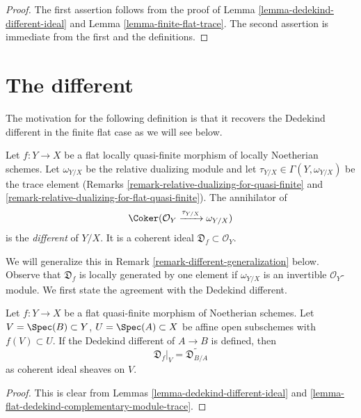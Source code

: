 \begin{proof}
The first assertion
follows from the proof of Lemma \ref{lemma-dedekind-different-ideal}
and Lemma \ref{lemma-finite-flat-trace}.
The second assertion is immediate from the first and the
definitions.
\end{proof}



\section{The different}
\label{section-different}

\noindent
The motivation for the following definition is that it recovers the
Dedekind different in the finite flat case as we will see below.

\begin{definition}
\label{definition-different}
Let $f : Y \to X$ be a flat locally quasi-finite morphism of
locally Noetherian schemes.
Let $\omega_{Y/X}$ be the relative dualizing module and let
$\tau_{Y/X} \in \Gamma(Y, \omega_{Y/X})$ be the trace element
(Remarks \ref{remark-relative-dualizing-for-quasi-finite} and
\ref{remark-relative-dualizing-for-flat-quasi-finite}).
The annihilator of
$$
\Coker(\mathcal{O}_Y \xrightarrow{\tau_{Y/X}} \omega_{Y/X})
$$
is the {\it different} of $Y/X$. It is a coherent ideal
$\mathfrak{D}_f \subset \mathcal{O}_Y$.
\end{definition}

\noindent
We will generalize this in Remark \ref{remark-different-generalization} below.
Observe that $\mathfrak{D}_f$ is locally generated by one element if
$\omega_{Y/X}$ is an invertible $\mathcal{O}_Y$-module.
We first state the agreement with the Dedekind different.

\begin{lemma}
\label{lemma-flat-agree-dedekind}
Let $f : Y \to X$ be a flat quasi-finite morphism of Noetherian schemes.
Let $V = \Spec(B) \subset Y$, $U = \Spec(A) \subset X$
be affine open subschemes with $f(V) \subset U$.
If the Dedekind different of $A \to B$ is defined, then
$$
\mathfrak{D}_f|_V = \widetilde{\mathfrak{D}_{B/A}}
$$
as coherent ideal sheaves on $V$.
\end{lemma}

\begin{proof}
This is clear from Lemmas \ref{lemma-dedekind-different-ideal} and
\ref{lemma-flat-dedekind-complementary-module-trace}.
\end{proof}

